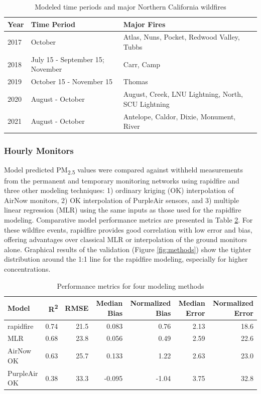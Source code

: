 \documentclass[gmd, manuscript]{copernicus}
\begin{document}
\begin{table}[h]
\caption{Modeled time periods and major Northern California wildfires}
\begin{tabular}{lll}
Year & Time Period              & Major Fires                                        \\ \hline
2017 & October                  & Atlas, Nuns, Pocket, Redwood Valley, Tubbs         \\
2018 & July 15 - September 15; November   & Carr, Camp                               \\
2019 & October 15 - November 15 & Thomas                                             \\
2020 & August - October         & August, Creek, LNU Lightning, North, SCU Lightning \\
2021 & August - October         & Antelope, Caldor, Dixie, Monument, River          
\end{tabular}
\label{table:2}
\end{table}

\subsubsection{Hourly Monitors}

Model predicted PM\textsubscript{2.5} values were compared against
withheld measurements from the permanent and temporary monitoring
networks using rapidfire and three other modeling techniques: 1)
ordinary kriging (OK) interpolation of AirNow monitors, 2) OK
interpolation of PurpleAir sensors, and 3) multiple linear regression
(MLR) using the same inputs as those used for the rapidfire modeling.
Comparative model performance metrics are presented in Table
\ref{table:3}. For these wildfire events, rapidfire provides good
correlation with low error and bias, offering advantages over classical
MLR or interpolation of the ground monitors alone. Graphical results of
the validation (Figure \ref{fig:methods}) show the tighter distribution
around the 1:1 line for the rapidfire modeling, especially for higher
concentrations.

\begin{table}[h]
\caption{Performance metrics for four modeling methods}
\begin{tabular}{lrrrrrr}
Model     & R\textsuperscript{2}    & RMSE    & Median Bias    & Normalized Bias   & Median Error   & Normalized Error    \\ \hline
rapidfire & 0.74  & 21.5    & 0.083   & 0.76              & 2.13    & 18.6 \\
MLR       & 0.68  & 23.8    & 0.056   & 0.49              & 2.59    & 22.6  \\
AirNow OK & 0.63  & 25.7    & 0.133   & 1.22              & 2.63    & 23.0  \\
PurpleAir OK & 0.38 & 33.3  & -0.095  & -1.04             & 3.75    & 32.8
\end{tabular}
\label{table:3}
\end{table}
\end{document}
